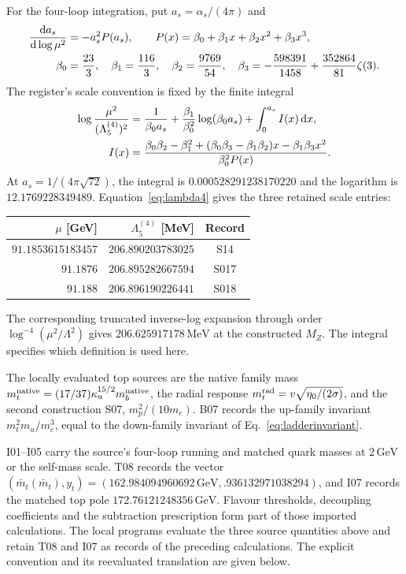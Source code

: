 \documentclass[aps,prx,onecolumn,10pt,notitlepage,nofootinbib,longbibliography]{revtex4-2}
\numberwithin{equation}{section}
\numberwithin{table}{section}
\newcommand{\dd}{\mathrm d}
\newcommand{\MeV}{\,\mathrm{MeV}}
\newcommand{\GeV}{\,\mathrm{GeV}}
\begin{document}
For the four-loop integration\cite{Beta4}, put $a_s=\alpha_s/(4\pi)$ and
\begin{align}
 \frac{\dd a_s}{\dd\log\mu^2}&=-a_s^2P(a_s),\qquad
 P(x)=\beta_0+\beta_1x+\beta_2x^2+\beta_3x^3,\notag\\
 \beta_0&=\frac{23}{3},\quad \beta_1=\frac{116}{3},\quad
 \beta_2=\frac{9769}{54},\quad
 \beta_3=-\frac{598391}{1458}+\frac{352864}{81}\zeta(3).
\end{align}
The register's scale convention is fixed by the finite integral
\begin{align}
 \log\frac{\mu^2}{(\Lambda_5^{(4)})^2}
 &=\frac1{\beta_0a_s}+\frac{\beta_1}{\beta_0^2}\log(\beta_0a_s)
 +\int_0^{a_s}I(x)\,\dd x,\notag\\
 I(x)&=\frac{\beta_0\beta_2-\beta_1^2+
 (\beta_0\beta_3-\beta_1\beta_2)x-\beta_1\beta_3x^2}
 {\beta_0^2P(x)}.
 \label{eq:lambda4}
\end{align}
At $a_s=1/(4\pi\sqrt{72})$, the integral is $0.000528291238170220$ and the logarithm is $12.1769228349489$. Equation~\eqref{eq:lambda4} gives the three retained scale entries:
\begin{center}
\begin{tabular}{rrc}
\toprule
$\mu$ [GeV]&$\Lambda_5^{(4)}$ [MeV]&Record\\\midrule
$91.1853615183457$&$206.890203783025$&S14\\
$91.1876$&$206.895282667594$&S017\\
$91.188$&$206.896190226441$&S018\\\bottomrule
\end{tabular}
\end{center}
The corresponding truncated inverse-log expansion through order $\log^{-4}(\mu^2/\Lambda^2)$ gives $206.625917178\MeV$ at the constructed $M_Z$. The integral specifies which definition is used here.

The locally evaluated top sources are the native family mass
$m_t^{\rm native}=(17/37)\kappa_u^{15/2}m_b^{\rm native}$, the radial response
$m_t^{\rm rad}=v\sqrt{\eta_0/(2\sigma)}$, and the second construction S07,
$m_p^2/(10m_e)$. B07 records the up-family invariant $m_t^2m_u/m_c^3$,
equal to the down-family invariant of Eq.~\eqref{eq:ladderinvariant}.

I01--I05 carry the source's four-loop running and matched quark masses at $2\GeV$ or the self-mass scale. T08 records the vector $(\bar m_t(\bar m_t),y_t)=(162.984094960692\GeV,.936132971038294)$, and I07 records the matched top pole $172.76121248356\GeV$. Flavour thresholds, decoupling coefficients and the subtraction prescription form part of those imported calculations. The local programs evaluate the three source quantities above and retain T08 and I07 as records of the preceding calculations. The explicit convention and its reevaluated translation are given below.
\end{document}
